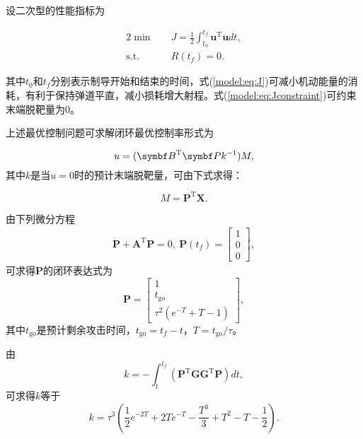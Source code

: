 设二次型的性能指标为

\begin{alignat}{2}
	\label{model:eq:J} \min \quad & J = \frac{1}{2}\int_{t_0}^{t_f} {\bm u}^{\mathrm T} {\bm u} dt,\\
	\mbox{s.t.} \quad 
	\label{model:eq:Jconstraint} & R(t_f)=0.
\end{alignat}

其中$t_0$和$t_f$分别表示制导开始和结束的时间，式(\ref{model:eq:J})可减小机动能量的消耗，有利于保持弹道平直，减小损耗增大射程。式(\ref{model:eq:Jconstraint})可约束末端脱靶量为0。

上述最优控制问题可求解闭环最优控制率形式为

\begin{equation}
\label{model:eq:closedU}
	u = ({\bm B}^{\text T}{\bm P}k^{-1})M,
\end{equation}
其中$k$是当$u=0$时的预计末端脱靶量，可由下式求得：

\begin{equation}
\label{model:eq:M}
	M={\bm P}^{\mathrm T}{\bm X}.
\end{equation}

由下列微分方程
\begin{align}
\label{model:eq:ricati}
	\dot{\bm P} + {\bm A}^{\mathrm T}{\bm P} = 0,\ {\bm P}(t_f)=\begin{bmatrix}
		1\\0\\0
	\end{bmatrix},
\end{align}
可求得$\bm P$的闭环表达式为
\begin{equation}
\label{model:eq:P}
	{\bm P} = \begin{bmatrix}
		1\\t_{\text{go}}\\\tau^2(e^{-T}+T-1)
	\end{bmatrix},
\end{equation}
其中$t_{\text{go}}$是预计剩余攻击时间，$t_{\text{go}}=t_f-t$，$T=t_{\text{go}}/\tau$。

由
\begin{equation}
\label{model:eq:k}
	k = -\int_{t}^{t_f} ({\bm P}^{\mathrm T}{\bm G}{\bm G}^{\mathrm T}{\bm P}) dt,
\end{equation}
可求得$k$等于
\begin{equation}
\label{model:eq:ksolution}
	k = \tau^3(\frac{1}{2}e^{-2T} + 2Te^{-T} - \frac{T^3}{3} + T^2 - T - \frac{1}{2}).
\end{equation}

